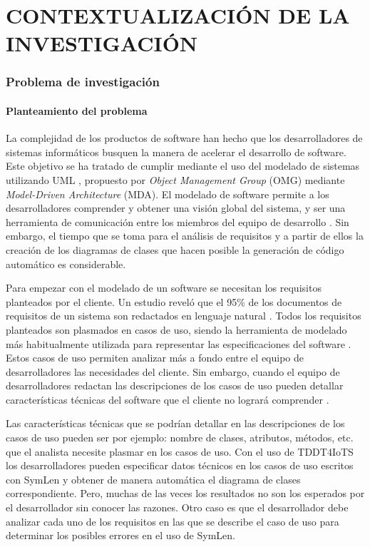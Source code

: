 \setcounter{chapter}{1}
\setcounter{section}{0}
\part{CONTEXTUALIZACIÓN DE LA INVESTIGACIÓN} 

\section{Problema de investigación}

\subsection{Planteamiento del problema}
La complejidad de los productos de software han hecho que los desarrolladores de sistemas informáticos busquen la manera de acelerar el desarrollo de software. Este objetivo se ha tratado de cumplir mediante el uso del modelado de sistemas utilizando UML \parencite{Jahan2021}, propuesto por \textit{Object Management Group} (OMG) mediante \textit{Model-Driven Architecture} (MDA). El modelado de software permite a los desarrolladores comprender y obtener una visión global del sistema, y ser una herramienta de comunicación entre los miembros del equipo de desarrollo \parencite{gonzalez2022}. Sin embargo, el tiempo que se toma para el análisis de requisitos y a partir de ellos la creación de los diagramas de clases que hacen posible la generación de código automático es considerable.

Para empezar con el modelado de un software se necesitan los requisitos planteados por el cliente. Un estudio reveló que el 95\% de los documentos de requisitos de un sistema son redactados en lenguaje natural \parencite{Jahan2021}. Todos los requisitos planteados son plasmados en casos de uso, siendo la herramienta de modelado más habitualmente utilizada para representar las especificaciones del software \parencite{hamza2021}. Estos casos de uso permiten analizar más a fondo entre el equipo de desarrolladores las necesidades del cliente. Sin embargo, cuando el equipo de desarrolladores redactan las descripciones de los casos de uso pueden detallar características técnicas del software que el cliente no logrará comprender \parencite{Abdelnabi2021}. %

Las características técnicas que se podrían detallar en las descripciones de los casos de uso pueden ser  por ejemplo: nombre de clases, atributos, métodos, etc. que el analista necesite plasmar en los casos de uso. Con el uso de TDDT4IoTS los desarrolladores  pueden especificar datos técnicos en los casos de uso escritos con SymLen y obtener de manera automática el diagrama de clases correspondiente. Pero, muchas de las veces los resultados no son los esperados por el desarrollador sin conocer las razones. Otro caso es que el desarrollador debe analizar cada uno de los requisitos en las que se describe el caso de uso para determinar los posibles errores en el uso de SymLen.

